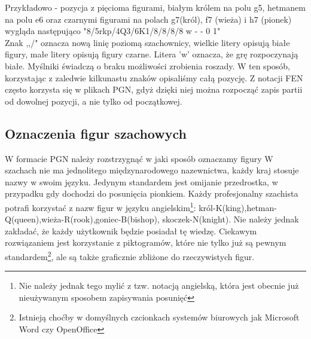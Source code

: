 \documentclass[12pt,leqno]{article}
\begin{document}
Przykładowo - pozycja z pięcioma figurami, białym królem na polu g5, hetmanem na polu e6 oraz czarnymi figurami na polach g7(król), f7 (wieża) i h7 (pionek) wygląda następująco "8/5rkp/4Q3/6K1/8/8/8/8 w - - 0 1" \\
Znak ,,/" oznacza nową linię poziomą szachownicy, wielkie litery opisują białe figury, małe litery opisują figury czarne. Litera 'w' oznacza, że grę rozpoczynają białe. Myślniki świadczą o braku możliwości zrobienia roszady. W ten sposób, korzystając z zaledwie kilkunastu znaków opisaliśmy całą pozycję. Z notacji FEN często korzysta się w plikach PGN, gdyż dzięki niej można rozpocząć zapis partii od dowolnej pozycji, a nie tylko od początkowej. 


\subsection{Oznaczenia figur szachowych}
W formacie PGN należy rozstrzygnąć w jaki sposób oznaczamy figury W szachach nie ma jednolitego międzynarodowego nazewnictwa, każdy kraj stosuje nazwy w swoim języku. Jedynym standardem jest omijanie przedrostka, w przypadku gdy dochodzi do posunięcia pionkiem. Każdy profesjonalny szachista potrafi korzystać z nazw figur w języku angielskim\footnote{Nie należy jednak tego mylić z tzw. notacją angielską, która jest obecnie już nieużywanym sposobem zapisywania posunięć}: król-K(king),hetman-Q(queen),wieża-R(rook),goniec-B(bishop), skoczek-N(knight). Nie należy jednak zakładać, że każdy użytkownik będzie posiadał tę wiedzę. Ciekawym rozwiązaniem jest korzystanie z piktogramów, które nie tylko już są pewnym standardem\footnote{Istnieją choćby w domyślnych czcionkach systemów biurowych jak Microsoft Word czy OpenOffice}, ale są także graficznie zbliżone do rzeczywistych figur.  
\end{document}
